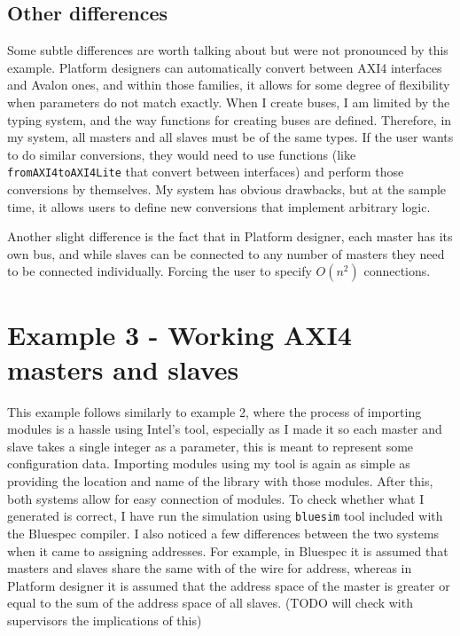\documentclass[12pt]{report}
\begin{document}
\subsection{Other differences} 
Some subtle differences are worth talking about but were not pronounced by this example. 
Platform designers can automatically convert between AXI4 interfaces and Avalon ones, and within those families, it allows for some degree of flexibility when parameters do not match exactly. 
When I create buses, I am limited by the typing system, and the way functions for creating buses are defined. Therefore, in my system, all masters and all slaves must be of the same types. If the user wants to do similar conversions, they would need to use functions (like \verb!fromAXI4toAXI4Lite! that convert between interfaces) and perform those conversions by themselves. My system has obvious drawbacks, but at the sample time, it allows users to define new conversions that implement arbitrary logic. 
\par 
Another slight difference is the fact that in Platform designer, each master has its own bus, and while slaves can be connected to any number of masters they need to be connected individually. Forcing the user to specify $O(n^2)$ connections. 
\section{Example 3 - Working AXI4 masters and slaves} 
This example follows similarly to example 2, where the process of importing modules is a hassle using Intel's tool, especially as I made it so each master and slave takes a single integer as a parameter, this is meant to represent some configuration data. Importing modules using my tool is again as simple as providing the location and name of the library with those modules. After this, both systems allow for easy connection of modules. To check whether what I generated is correct, I have run the simulation using \verb!bluesim! tool included with the Bluespec compiler. I also noticed a few differences between the two systems when it came to assigning addresses. For example, in Bluespec it is assumed that masters and slaves share the same with of the wire for address, whereas in Platform designer it is assumed that the address space of the master is greater or equal to the sum of the address space of all slaves. (TODO will check with supervisors the implications of this) 
 
\end{document}
